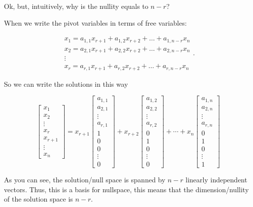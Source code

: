 Ok, but, intuitively, why is the nullity equals to $n-r$?

When we write the pivot variables in terms of free variables:

$$
\begin{aligned}
x_1 = a_{1,1}x_{r+1} + a_{1,2}x_{r+2} + \dots + a_{1,n-r}x_n\\
x_2 = a_{2,1}x_{r+1} + a_{2,2}x_{r+2} + \dots + a_{2,n-r}x_n\\
\vdots\\
x_r = a_{r,1}x_{r+1} + a_{r,2}x_{r+2} + \dots + a_{r,n-r}x_n
\end{aligned}.
$$

So we can write the solutions in this way

$$\begin{bmatrix}
    x_1\\
    x_2\\
    \vdots\\
    x_r\\
    x_{r+1}\\
    \vdots\\
    x_{n}
\end{bmatrix}=
x_{r+1} \begin{bmatrix}
    a_{1,1}\\
    a_{2,1}\\
    \vdots\\
    a_{r,1}\\
    1\\
    0\\
    0\\
    \vdots\\
    0
\end{bmatrix} + x_{r+2} \begin{bmatrix}
    a_{1,2}\\
    a_{2,2}\\
    \vdots\\
    a_{r,2}\\
    0\\
    1\\
    0\\
    \vdots\\
    0
\end{bmatrix} + \cdots + x_{n} \begin{bmatrix}
    a_{1,n}\\
    a_{2,n}\\
    \vdots\\
    a_{r,n}\\
    0\\
    1\\
    0\\
    \vdots\\
    1
\end{bmatrix}
$$

As you can see, the solution/null space is spanned by $n-r$ linearly independent vectors. Thus, this is a basis for nullspace, this means that the dimension/nullity of the solution space is $n-r$.
